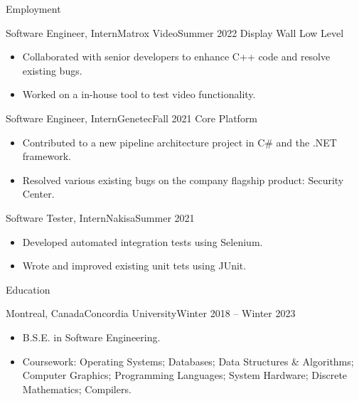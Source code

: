 \documentclass[]{mcdowellcv}
\begin{document}
	\makeheader
	
	\begin{cvsection}{Employment}
		\begin{cvsubsection}{Software Engineer, Intern}{Matrox Video}{Summer 2022}
		    Display Wall Low Level	
			\begin{itemize}
                \item Collaborated with senior developers to enhance C++ code and resolve existing bugs.
                \item Worked on a in-house tool to test video functionality.
			\end{itemize}
		\end{cvsubsection}
		
		\begin{cvsubsection}{Software Engineer, Intern}{Genetec}{Fall 2021}	
            Core Platform
			\begin{itemize}
                \item Contributed to a new pipeline architecture project in C\# and the .NET framework.
                \item Resolved various existing bugs on the company flagship product: Security Center.
			\end{itemize}
		\end{cvsubsection}
		
		\begin{cvsubsection}{Software Tester, Intern}{Nakisa}{Summer 2021}		
			\begin{itemize}
                \item Developed automated integration tests using Selenium.
                \item Wrote and improved existing unit tets using JUnit.
			\end{itemize}
		\end{cvsubsection}
	\end{cvsection}
	
	\begin{cvsection}{Education}
		\begin{cvsubsection}{Montreal, Canada}{Concordia University}{Winter 2018 -- Winter 2023}
			\begin{itemize}
				\item B.S.E. in Software Engineering.
                \item Coursework: Operating Systems; Databases; Data Structures \& Algorithms; Computer Graphics; Programming Languages; System Hardware; Discrete Mathematics; Compilers.
			\end{itemize}
		\end{cvsubsection}
	\end{cvsection}
	
\end{document}
